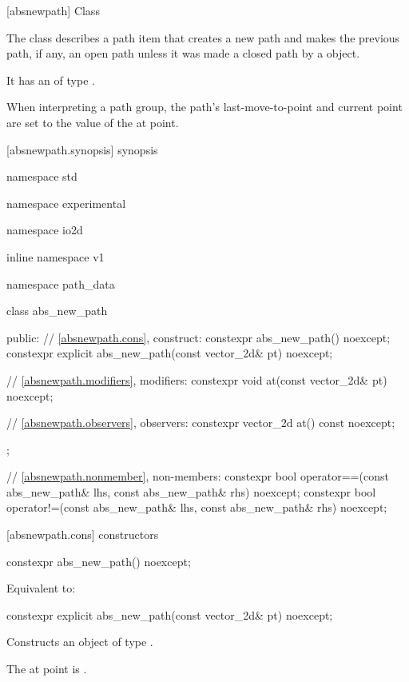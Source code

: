  [absnewpath] {Class }

\pnum
{}%
The class  describes a path item that creates a new path and makes the previous path, if any, an open path unless it was made a closed path by a  object.

\pnum
It has an  of type .

\pnum
When interpreting a path group, the path's last-move-to-point and current point are set to the value of the at point.

 [absnewpath.synopsis] { synopsis}%

\begin{codeblock}
namespace std { namespace experimental { namespace io2d { inline namespace v1 {
  namespace path_data {
    class abs_new_path {
    public:
      // \ref{absnewpath.cons}, construct:
      constexpr abs_new_path() noexcept;
      constexpr explicit abs_new_path(const vector_2d& pt) noexcept;

      // \ref{absnewpath.modifiers}, modifiers:
      constexpr void at(const vector_2d& pt) noexcept;

      // \ref{absnewpath.observers}, observers:
      constexpr vector_2d at() const noexcept;
    };
    
    // \ref{absnewpath.nonmember}, non-members:
    constexpr bool operator==(const abs_new_path& lhs, const abs_new_path& rhs) 
      noexcept;
    constexpr bool operator!=(const abs_new_path& lhs, const abs_new_path& rhs) 
      noexcept;
  }
} } } }
\end{codeblock}

 [absnewpath.cons] { constructors}%

%
\begin{itemdecl}
constexpr abs_new_path() noexcept;
\end{itemdecl}
\begin{itemdescr}
\pnum
\effects
Equivalent to: 
\end{itemdescr}

%
\begin{itemdecl}
constexpr explicit abs_new_path(const vector_2d& pt) noexcept;
\end{itemdecl}
\begin{itemdescr}
\pnum
\effects
Constructs an object of type .

\pnum
The at point is .
\end{itemdescr}

